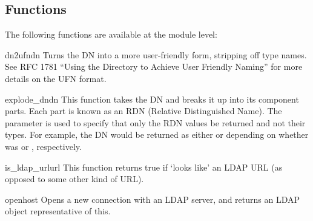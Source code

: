 

\subsection{Functions}

The following functions are available at the module level:


\begin{funcdesc}{dn2ufn}{dn}
Turns the DN  into a more user-friendly form, stripping off type names.
See RFC 1781 ``Using the Directory to Achieve User Friendly Naming''
for more details on the UFN format.
\end{funcdesc}


\begin{funcdesc}{explode_dn}{dn }
This function takes the DN  and breaks it up into its component parts. 
Each part is known as an RDN (Relative Distinguished Name). The
 parameter is used to specify that only the RDN values be returned
and not their types. For example, the DN  would be
returned as either \code{["cn=Bob", "c=US"]} or \code{["Bob","US"]}
depending on whether  was  or , respectively.
\end{funcdesc}


\begin{funcdesc}{is_ldap_url}{url}
This function returns true if  `looks like' an LDAP URL 
(as opposed to some other kind of URL). 
\end{funcdesc}


\begin{funcdesc}{open}{host }
Opens a new connection with an LDAP server, and returns an LDAP object
representative of this.
\end{funcdesc}
